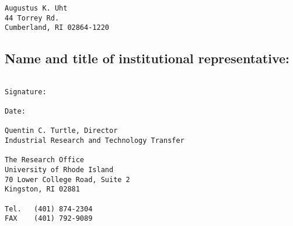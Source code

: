 \documentclass[10pt,dvips]{article}
\begin{document}
\begin{verbatim}
Augustus K. Uht
44 Torrey Rd.
Cumberland, RI 02864-1220
\end{verbatim}

\subsection{Name and title of institutional representative:}

\begin{verbatim}

Signature:

Date:

Quentin C. Turtle, Director
Industrial Research and Technology Transfer

The Research Office
University of Rhode Island
70 Lower College Road, Suite 2
Kingston, RI 02881

Tel.   (401) 874-2304
FAX    (401) 792-9089
\end{verbatim}
\end{document}
